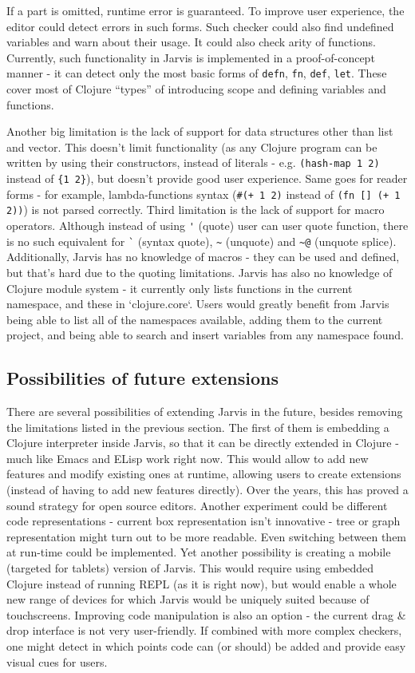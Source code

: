 \documentclass[11pt]{scrartcl}
\begin{document}
If a part is omitted, runtime error is guaranteed.
To improve user experience, the editor could detect errors in such forms.
Such checker could also find undefined variables and warn about their usage.
It could also check arity of functions.
Currently, such functionality in Jarvis is implemented in a proof-of-concept
manner - it can detect only the most basic forms of \lstinline|defn|,
\lstinline|fn|, \lstinline|def|, \lstinline|let|. These cover most of Clojure
“types” of introducing scope and defining variables and functions.

Another big limitation is the lack of support for data structures other than
list and vector.
This doesn’t limit functionality (as any Clojure program can be written by using
their constructors, instead of literals - e.g. \lstinline|(hash-map 1 2)|
instead of \lstinline|{1 2}|),
but doesn’t provide good user experience.
Same goes for reader forms - for example, lambda-functions syntax
(\lstinline|#(+ 1 2)|
instead of \lstinline|(fn [] (+ 1 2))|) is not parsed correctly.
Third limitation is the lack of support for macro operators.
Although instead of using \lstinline|'| (quote) user can user quote function, there is no
such equivalent for \lstinline|`| (syntax quote), \lstinline|~| (unquote) and
\lstinline|~@| (unquote splice).
Additionally, Jarvis has no knowledge of macros - they can be used and defined,
but that’s hard due to the quoting limitations.
Jarvis has also no knowledge of Clojure module system - it currently only lists
functions in the current namespace, and these in `clojure.core`.
Users would greatly benefit from Jarvis being able to list all of the namespaces
available, adding them to the current project, and being able to search and
insert variables from any namespace found.


\subsection{Possibilities of future extensions}
There are several possibilities of extending Jarvis in the future, besides
removing the limitations listed in the previous section.
The first of them is embedding a Clojure interpreter inside Jarvis, so that it
can be directly extended in Clojure - much like Emacs and ELisp work right now.
This would allow to add new features and modify existing ones at runtime,
allowing users to create extensions (instead of having to add new features
directly).
Over the years, this has proved a sound strategy for open source editors.
Another experiment could be different code representations - current box
representation isn’t innovative - tree or graph representation might turn out to
be more readable.
Even switching between them at run-time could be implemented.
Yet another possibility is creating a mobile (targeted for tablets) version of
Jarvis.
This would require using embedded Clojure instead of running REPL (as it is
right now), but would enable a whole new range of devices for which Jarvis would
be uniquely suited because of touchscreens.
Improving code manipulation is also an option - the current drag \& drop
interface is not very user-friendly.
If combined with more complex checkers, one might detect in which points code
can (or should) be added and provide easy visual cues for users.
\end{document}
